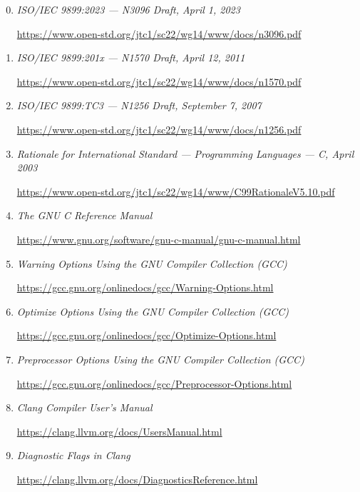 \begin{enumerate}

\setcounter{enumi}{-1}

\item \it{ISO/IEC 9899:2023 — N3096 Draft}, April 1, 2023

\url{https://www.open-std.org/jtc1/sc22/wg14/www/docs/n3096.pdf}

\item \it{ISO/IEC 9899:201x — N1570 Draft}, April 12, 2011

\url{https://www.open-std.org/jtc1/sc22/wg14/www/docs/n1570.pdf}

\item \it{ISO/IEC 9899:TC3 — N1256 Draft}, September 7, 2007

\url{https://www.open-std.org/jtc1/sc22/wg14/www/docs/n1256.pdf}

\item \it{Rationale for International Standard — Programming Languages — C},
April 2003

\url{https://www.open-std.org/jtc1/sc22/wg14/www/C99RationaleV5.10.pdf}

\item \it{The GNU C Reference Manual}

\url{https://www.gnu.org/software/gnu-c-manual/gnu-c-manual.html}

\item \it{Warning Options Using the GNU Compiler Collection (GCC)}

\url{https://gcc.gnu.org/onlinedocs/gcc/Warning-Options.html}

\item \it{Optimize Options Using the GNU Compiler Collection (GCC)}

\url{https://gcc.gnu.org/onlinedocs/gcc/Optimize-Options.html}

\item \it{Preprocessor Options Using the GNU Compiler Collection (GCC)}

\url{https://gcc.gnu.org/onlinedocs/gcc/Preprocessor-Options.html}

\item \it{Clang Compiler User's Manual}

\url{https://clang.llvm.org/docs/UsersManual.html}

\item \it{Diagnostic Flags in Clang}

\url{https://clang.llvm.org/docs/DiagnosticsReference.html}


\end{enumerate}
